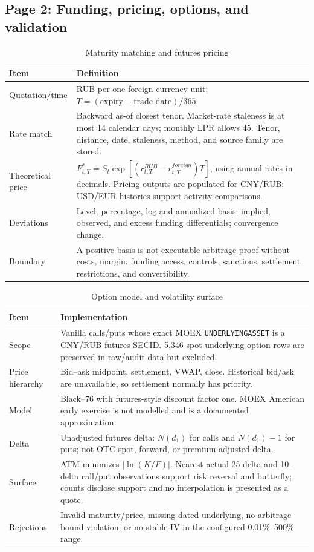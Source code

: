 \newpage
\subsection*{Page 2: Funding, pricing, options, and validation}

\begin{table}[ht]
\small
\caption{Maturity matching and futures pricing}
\begin{tabularx}{\textwidth}{>{\raggedright\arraybackslash}p{3.2cm} X}
\toprule
Item & Definition \\
\midrule
Quotation/time & RUB per one foreign-currency unit; $T=(\text{expiry}-\text{trade date})/365$. \\
Rate match & Backward as-of closest tenor. Market-rate staleness is at most 14 calendar days; monthly LPR allows 45. Tenor, distance, date, staleness, method, and source family are stored. \\
Theoretical price & $F^{*}_{t,T}=S_t\exp[(r^{RUB}_{t,T}-r^{foreign}_{t,T})T]$, using annual rates in decimals. Pricing outputs are populated for CNY/RUB; USD/EUR histories support activity comparisons. \\
Deviations & Level, percentage, log and annualized basis; implied, observed, and excess funding differentials; convergence change. \\
Boundary & A positive basis is not executable-arbitrage proof without costs, margin, funding access, controls, sanctions, settlement restrictions, and convertibility. \\
\bottomrule
\end{tabularx}
\end{table}

\begin{table}[ht]
\small
\caption{Option model and volatility surface}
\begin{tabularx}{\textwidth}{>{\raggedright\arraybackslash}p{3.2cm} X}
\toprule
Item & Implementation \\
\midrule
Scope & Vanilla calls/puts whose exact MOEX \texttt{UNDERLYINGASSET} is a CNY/RUB futures SECID. 5,346 spot-underlying option rows are preserved in raw/audit data but excluded. \\
Price hierarchy & Bid--ask midpoint, settlement, VWAP, close. Historical bid/ask are unavailable, so settlement normally has priority. \\
Model & Black--76 with futures-style discount factor one. MOEX American early exercise is not modelled and is a documented approximation. \\
Delta & Unadjusted futures delta: $N(d_1)$ for calls and $N(d_1)-1$ for puts; not OTC spot, forward, or premium-adjusted delta. \\
Surface & ATM minimizes $|\ln(K/F)|$. Nearest actual 25-delta and 10-delta call/put observations support risk reversal and butterfly; counts disclose support and no interpolation is presented as a quote. \\
Rejections & Invalid maturity/price, missing dated underlying, no-arbitrage-bound violation, or no stable IV in the configured 0.01\%--500\% range. \\
\bottomrule
\end{tabularx}
\end{table}

